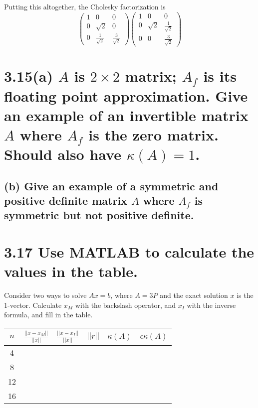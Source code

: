 \documentclass{article}
\begin{document}
Putting this altogether, the Cholesky factorization is
\[
\begin{pmatrix}
  1 & 0 & 0 \\ 0 & \sqrt{2} & 0 \\ 0 & \frac{1}{\sqrt{2}} & \frac{3}{\sqrt{2}}
\end{pmatrix}
\begin{pmatrix}
  1 & 0 & 0 \\ 0 & \sqrt{2} & \frac{1}{\sqrt{2}} \\ 0 & 0 & \frac{3}{\sqrt{2}}
\end{pmatrix}
\]

\section*{3.15(a) \normalsize $A$ is $2 \times 2$ matrix; $A_f$ is its floating point approximation. Give an example of an invertible matrix $A$ where $A_f$ is the zero matrix. Should also have $\kappa(A) = 1$.}




\subsection*{(b) \normalsize Give an example of a symmetric and positive definite matrix $A$ where $A_f$ is symmetric but not positive definite.}


\section*{3.17 \normalsize Use MATLAB to calculate the values in the table.}

Consider two ways to solve $Ax = b$, where $A = 3P$ and the exact solution $x$ is the 1-vector. Calculate $x_M$ with the backslash operator, and $x_I$ with the inverse formula, and fill in the table.


\begin{table}[h!]
\centering
\begin{tabular}{c |c| c | c |c |c}
  $n$ & $\frac{||x-x_M||}{||x||}$ & $\frac{||x-x_I||}{||x||}$ & $||r||$ & $\kappa(A)$ & $\epsilon\kappa(A)$ \\ [0.8ex]
\hline 
  4 &  &  &  &  & \\[0.5ex]\hline 
  8 &  &  &  &  & \\[0.5ex]\hline 
  12 &  &  &  &  & \\[0.5ex]\hline 
  16 &  &  &  &  & \\[0.5ex]
\end{tabular}
\end{table}
\end{document}
